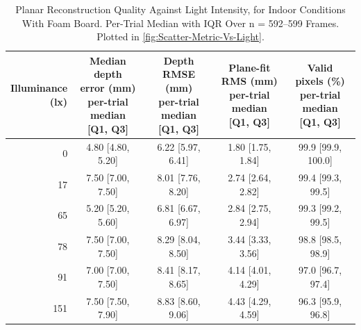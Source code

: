 \begin{table}[H]
	\centering
	\footnotesize
	\setlength{\tabcolsep}{4pt}
	\caption{Planar Reconstruction Quality Against Light Intensity, for Indoor Conditions With Foam Board. Per-Trial Median with IQR Over n = 592--599 Frames. Plotted in \autoref{fig:Scatter-Metric-Vs-Light}.}
	\label{tab:Scatter_Metric_Vs_Light}
	\begin{tabular}{r *{4}{c}}
		\toprule
		\makecell{Illuminance\\(lx)} & \makecell{Median depth\\error (mm)\\{\scriptsize per-trial median}\\{\scriptsize [Q1, Q3]}} & \makecell{Depth\\RMSE (mm)\\{\scriptsize per-trial median}\\{\scriptsize [Q1, Q3]}} & \makecell{Plane-fit\\RMS (mm)\\{\scriptsize per-trial median}\\{\scriptsize [Q1, Q3]}} & \makecell{Valid\\pixels (\%)\\{\scriptsize per-trial median}\\{\scriptsize [Q1, Q3]}} \\
		\midrule
		0 & 4.80 [4.80, 5.20] & 6.22 [5.97, 6.41] & 1.80 [1.75, 1.84] & 99.9 [99.9, 100.0] \\
		17 & 7.50 [7.00, 7.50] & 8.01 [7.76, 8.20] & 2.74 [2.64, 2.82] & 99.4 [99.3, 99.5] \\
		65 & 5.20 [5.20, 5.60] & 6.81 [6.67, 6.97] & 2.84 [2.75, 2.94] & 99.3 [99.2, 99.5] \\
		78 & 7.50 [7.00, 7.50] & 8.29 [8.04, 8.50] & 3.44 [3.33, 3.56] & 98.8 [98.5, 98.9] \\
		91 & 7.00 [7.00, 7.50] & 8.41 [8.17, 8.65] & 4.14 [4.01, 4.29] & 97.0 [96.7, 97.4] \\
		151 & 7.50 [7.50, 7.90] & 8.83 [8.60, 9.06] & 4.43 [4.29, 4.59] & 96.3 [95.9, 96.8] \\
		\bottomrule
	\end{tabular}
\end{table}

